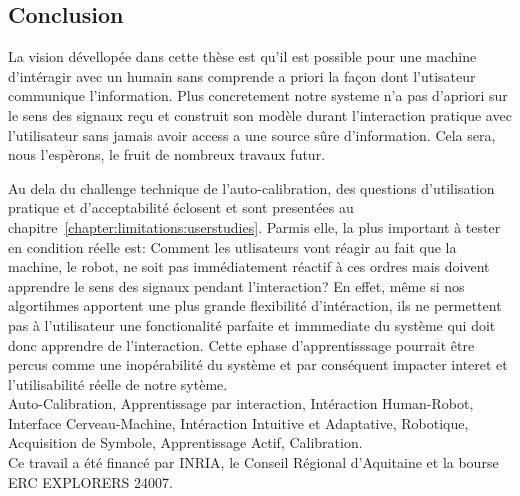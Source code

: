 \subsection*{Conclusion}

La vision dévellopée dans cette thèse est qu'il est possible pour une machine d'intéragir avec un humain sans comprende a priori la façon dont l'utisateur communique l'information. Plus concretement notre systeme n'a pas d'apriori sur le sens des signaux reçu et construit son modèle durant l'interaction pratique avec l'utilisateur sans jamais avoir access a une source sûre d'information. Cela sera, nous l'espèrons, le fruit de nombreux travaux futur.

Au dela du challenge technique de l'auto-calibration, des questions d'utilisation pratique et d'acceptabilité éclosent et sont presentées au chapitre~\ref{chapter:limitations:userstudies}. Parmis elle, la plus important à tester en condition réelle est: Comment les utlisateurs vont réagir au fait que la machine, le robot, ne soit pas immédiatement réactif à ces ordres mais doivent apprendre le sens des signaux pendant l'interaction? En effet, même si nos algortihmes apportent une plus grande flexibilité d'intéraction, ils ne permettent pas à l'utilisateur une fonctionalité parfaite et immmediate du système qui doit donc apprendre de l'interaction. Cette ephase d'apprentisssage pourrait être percus comme une inopérabilité du système et par conséquent impacter interet et l'utilisabilité réelle de notre sytème.\\

 Auto-Calibration, Apprentissage par interaction, Intéraction Human-Robot, Interface Cerveau-Machine, Intéraction Intuitive et Adaptative, Robotique, Acquisition de Symbole, Apprentissage Actif, Calibration.\\

Ce travail a été financé par INRIA, le Conseil R\'egional d'Aquitaine et la bourse ERC EXPLORERS 24007.
